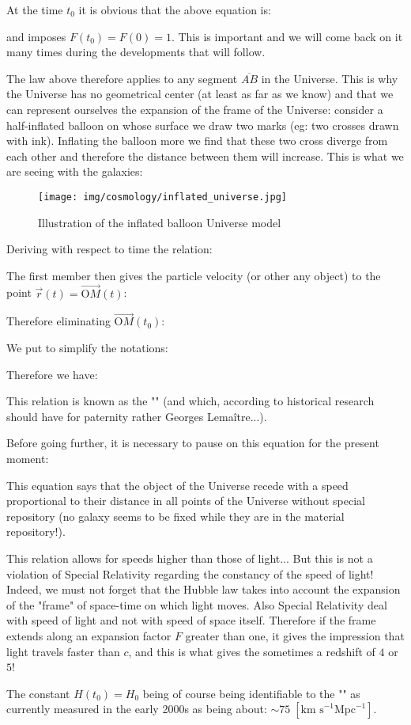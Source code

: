 	\begin{tcolorbox}[title=Remark,colframe=black,arc=10pt]
	At the time $t_0$ it is obvious that the above equation is:
	
	and imposes $F(t_0)=F(0)=1$. This is important and we will come back on it many times during the developments that will follow.
	\end{tcolorbox}
	The law above therefore applies to any segment $\overline{AB}$ in the Universe. This is why the Universe has no geometrical center (at least as far as we know) and that we can represent ourselves the expansion of the frame of the Universe: consider a half-inflated balloon on whose surface we draw two marks (eg: two crosses drawn with ink). Inflating the balloon more we find that these two cross diverge from each other and therefore the distance between them will increase. This is what we are seeing with the galaxies:
	\begin{figure}[H]
		\begin{center}
		\texttt{[image: img/cosmology/inflated\_universe.jpg]}
		\end{center}	
		\caption{Illustration of the inflated balloon Universe model}
	\end{figure}
	
	Deriving with respect to time the relation:
	
	The first member then gives the particle velocity (or other any object) to the point $\vec{r}(t)=\overrightarrow{\text{O}M}(t)$:
	
	Therefore eliminating $\overrightarrow{\text{O}M}(t_0)$:
	
	We put to simplify the notations:
	
	Therefore we have:
	
	This relation is known as the "" (and which, according to historical research should have for paternity rather Georges Lemaître...).
	
	Before going further, it is necessary to pause on this equation for the present moment:
	
	This equation says that the object of the Universe recede with a speed proportional to their distance in all points of the Universe without special repository (no galaxy seems to be fixed while they are in the material repository!).
	\begin{tcolorbox}[title=Remark,colframe=black,arc=10pt]
	This relation allows for speeds higher than those of light... But this is not a violation of Special Relativity regarding the constancy of the speed of light! Indeed, we must not forget that the Hubble law takes into account the expansion of the "frame" of space-time on which light moves. Also Special Relativity deal with speed of light and not with speed of space itself. Therefore if the frame extends along an expansion factor $F$ greater than one, it gives the impression that light travels faster than $c$, and this is what gives the sometimes a redshift of $4$ or $5$!
	\end{tcolorbox}
	The constant $H(t_0)=H_0$ being of course being identifiable to the "" as currently measured in the early 2000s as being about: $\sim 75\; [\text{km s}^{-1} \text{Mpc}^{-1}]$.
	
